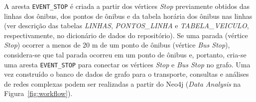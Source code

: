 A aresta \texttt{EVENT\_STOP} é criada a partir dos vértices \emph{Stop} previamente obtidos das linhas dos ônibus, dos pontos de ônibus e da tabela horária dos ônibus nas linhas (ver descrição das tabelas \emph{LINHAS}, \emph{PONTOS\_LINHA} e \emph{TABELA\_VEICULO}, respectivamente, no dicionário de dados do repositório). Se uma parada (vértice \emph{Stop}) ocorrer a menos de 20 m de um ponto de ônibus (vértice \emph{Bus Stop}), considera-se que tal parada ocorreu em um ponto de ônibus e, portanto, cria-se uma aresta \texttt{EVENT\_STOP} para conectar os vértices \emph{Stop} e \emph{Bus Stop} no grafo.
Uma vez construído o banco de dados de grafo para o transporte, consultas e análises de redes complexas podem ser realizadas a partir do Neo4j (\emph{Data Analysis} na Figura~\ref{fig:workflow}).
 
